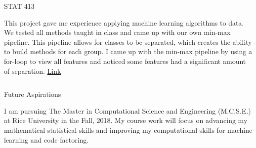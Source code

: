 \documentclass[final]{beamer}
\newlength{\onecolwid}
\newlength{\twocolwid}
\begin{document}
\begin{frame}[t]
\begin{columns}[t]
\begin{column}{\twocolwid}
\begin{columns}[t,totalwidth=\twocolwid]
\begin{column}{\onecolwid}\vspace{-.6in} %


\begin{block}{STAT 413}

This project gave me experience applying machine 
learning algorithms to data. We tested all methods 
taught in class and came up with our own min-max
pipeline. This pipeline allows for classes to be 
separated, which creates the ability to build methods for each group. I came up with the min-max pipeline by using a for-loop to view all features and noticed some features had a significant amount of separation. 
\href{https://www.dropbox.com/s/d0ahud1j1f8ex5p/stat-413.pdf?dl=0}
{Link}

\end{block}


\end{column} %

\end{columns} %


\begin{alertblock}{Future Aspirations}

I am pursuing The Master in Computational Science and Engineering (M.C.S.E.) at Rice 
University in the Fall, 2018. My course work will focus on advancing my mathematical 
statistical skills and improving my computational skills for machine learning and 
code factoring. 

\end{alertblock} 


\begin{columns}[t,totalwidth=\twocolwid] %


\end{columns}
\end{column}
\end{columns}
\end{frame}
\end{document}
